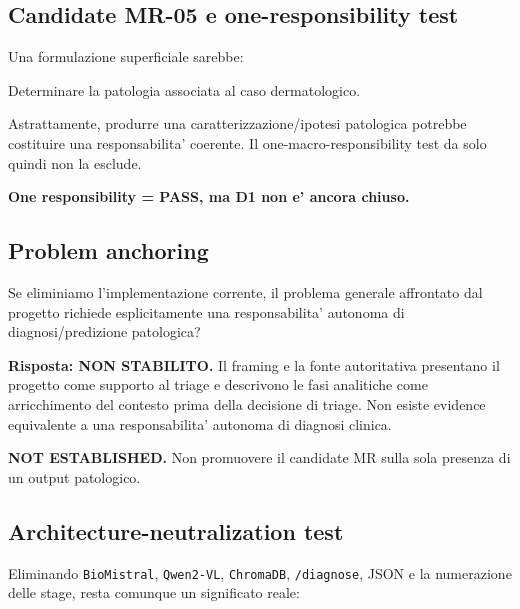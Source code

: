 \documentclass[11pt,a4paper]{article}
\begin{document}
\subsection{Candidate MR-05 e one-responsibility test}

Una formulazione superficiale sarebbe:

\begin{ddtacore}[title={Candidate MR-05 - Predizione patologica del caso dermatologico}]
Determinare la patologia associata al caso dermatologico.
\end{ddtacore}

Astrattamente, produrre una caratterizzazione/ipotesi patologica potrebbe costituire una responsabilita' coerente. Il one-macro-responsibility test da solo quindi non la esclude.

\textbf{One responsibility = PASS, ma D1 non e' ancora chiuso.}

\subsection{Problem anchoring}

\begin{ddtacheck}[title={Domanda}]
Se eliminiamo l'implementazione corrente, il problema generale affrontato dal progetto richiede esplicitamente una responsabilita' autonoma di diagnosi/predizione patologica?
\end{ddtacheck}

\textbf{Risposta: NON STABILITO.} Il framing e la fonte autoritativa presentano il progetto come supporto al triage e descrivono le fasi analitiche come arricchimento del contesto prima della decisione di triage. Non esiste evidence equivalente a una responsabilita' autonoma di diagnosi clinica.

\begin{ddtaopen}[title={Problem-anchoring disposition}]
\textbf{NOT ESTABLISHED.} Non promuovere il candidate MR sulla sola presenza di un output patologico.
\end{ddtaopen}

\subsection{Architecture-neutralization test}

Eliminando \texttt{BioMistral}, \texttt{Qwen2-VL}, \texttt{ChromaDB}, \texttt{/diagnose}, JSON e la numerazione delle stage, resta comunque un significato reale:
\end{document}
